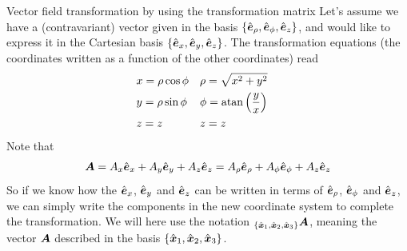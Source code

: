 \documentclass[a4paper, 12pt]{article}
\begin{document}
\begin{example}{Vector field transformation by using the transformation matrix}
 \label{ex:vft}
 Let's assume we have a (contravariant) vector given in the basis 
$\{\hat{\boldsymbol{e}}_\rho, 
 \hat{\boldsymbol{e}}_\phi, \hat{\boldsymbol{e}}_z\}$, and would like to express it in the Cartesian basis 
 $\{\hat{\boldsymbol{e}}_x, \hat{\boldsymbol{e}}_y, \hat{\boldsymbol{e}}_z\}$. The transformation equations (the 
coordinates 
 written as a function of the other coordinates) read
 \begin{align*}
  &x = \rho \cos\phi&
  &\rho = \sqrt{x^2+y^2}&
  \\
  &y = \rho \sin\phi&
  &\phi = \text{atan}\left(\frac{y}{x}\right)&
  \\
  &z=z&
  &z=z&
 \end{align*}
 Note that
 \begin{align}
  \boldsymbol{A} =
  A_x \hat{\boldsymbol{e}}_x + A_y \hat{\boldsymbol{e}}_y + A_z \hat{\boldsymbol{e}}_z =
  A_\rho \hat{\boldsymbol{e}}_\rho + A_\phi \hat{\boldsymbol{e}}_\phi + A_z  \hat{\boldsymbol{e}}_z
  \label{eq:component}
 \end{align}
 So if we know how the $\hat{\boldsymbol{e}}_x$, $\hat{\boldsymbol{e}}_y$ and $\hat{\boldsymbol{e}}_z$ can be written in 
terms 
 of $\hat{\boldsymbol{e}}_\rho$, $\hat{\boldsymbol{e}}_\phi$ and $\hat{\boldsymbol{e}}_z$, we can simply write the 
components 
 in the new coordinate system to complete the transformation. We will here use 
 the notation $_{\{\hat{\boldsymbol{x}}_1, \hat{\boldsymbol{x}}_2, \hat{\boldsymbol{x}}_3\}} \boldsymbol{A}$, meaning the vector 
 $\boldsymbol{A}$ described in the basis ${\{\hat{\boldsymbol{x}}_1, \hat{\boldsymbol{x}}_2, \hat{\boldsymbol{x}}_3\}}$.
 

\end{example}
\end{document}
